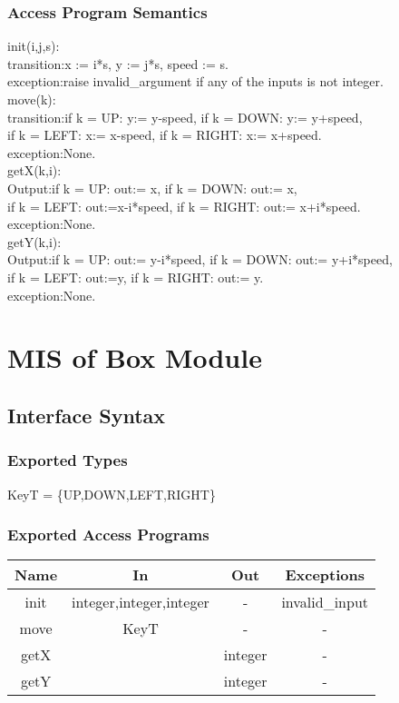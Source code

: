 \documentclass[12pt, titlepage]{article}
\begin{document}
\subsubsection{Access Program Semantics}
init(i,j,s):\\
transition:x := i*s, y := j*s, speed := s.\\
exception:raise invalid\_argument if any of the inputs is not integer.\\
move(k):\\
transition:if k = UP: y:= y-speed, if k = DOWN: y:= y+speed,\\
if k = LEFT: x:= x-speed, if k = RIGHT: x:= x+speed.\\
exception:None.\\
getX(k,i):\\
Output:if k = UP: out:= x, if k = DOWN: out:= x,\\
if k = LEFT: out:=x-i*speed, if k = RIGHT: out:= x+i*speed.\\
exception:None.\\
getY(k,i):\\
Output:if k = UP: out:= y-i*speed, if k = DOWN: out:= y+i*speed,\\
if k = LEFT: out:=y, if k = RIGHT: out:= y.\\
exception:None.

\section{MIS of Box Module}
\subsection{Interface Syntax}
\subsubsection{Exported Types}
KeyT = \{UP,DOWN,LEFT,RIGHT\}
\subsubsection{Exported Access Programs}
\begin{tabular}[pos]{|c|c|c|c|}
\hline
\textbf{Name}& \textbf{In} & \textbf{Out} & \textbf{Exceptions} \\ \hline
 init&integer,integer,integer  &-  &invalid\_input \\ \hline
 move& KeyT & - &- \\ \hline
 getX&  & integer &- \\ \hline
 getY&  & integer &- \\ \hline
\end{tabular}
\end{document}
